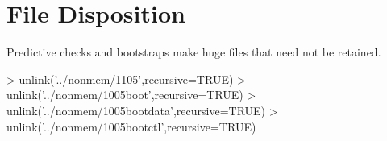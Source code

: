 \section{File Disposition}
Predictive checks and bootstraps make huge files that need not be retained.
\begin{Schunk}
\begin{Sinput}
> unlink('../nonmem/1105',recursive=TRUE)
> unlink('../nonmem/1005boot',recursive=TRUE)
> unlink('../nonmem/1005bootdata',recursive=TRUE)
> unlink('../nonmem/1005bootctl',recursive=TRUE)
\end{Sinput}
\end{Schunk}

